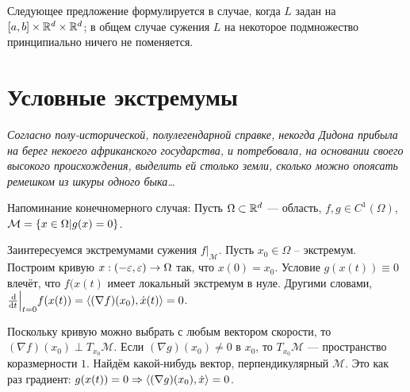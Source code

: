 \documentclass[a4paper]{article}
\begin{document}
    Следующее предложение формулируется в случае, когда $L$ задан на $[a, b] \times \mathbb{R}^d \times \mathbb{R}^d$; в общем случае сужения $L$ на некоторое подмножество принципиально ничего не поменяется.
    \section{Условные экстремумы}
    \emph{Согласно полу-исторической, полулегендарной справке, некогда Дидона прибыла на берег некоего африканского государства, и потребовала, на основании своего высокого происхождения, выделить ей столько земли, сколько можно опоясать ремешком из шкуры одного быка\ldots}

    Напоминание конечномерного случая:
    Пусть $\Omega \subset \mathbb{R}^d$ --- область, $f, g \in C^1(\Omega)$, $\mathcal{M} = \left\{x \in \Omega\middle|g(x) = 0\right\}$.

    Заинтересуемся экстремумами сужения $f\big|_{\mathcal{M}}$.
    Пусть $x_0 \in \Omega$ -- экстремум.
    Построим кривую ${x:(-\varepsilon,\varepsilon)\rightarrow \Omega}$ так, что $x(0) = x_0$.
    Условие $g(x(t)) \equiv 0$ влечёт, что $f(x(t)$ имеет локальный экстремум в нуле.
    Другими словами, $\frac{\operatorname{d}\!}{\operatorname{d}\! t}\Big|_{t = 0}f(x(t)) = \left\langle(\nabla f)(x_0), \dot{x}(t)\right\rangle = 0$.

    Поскольку кривую можно выбрать с любым вектором скорости, то $(\nabla f)(x_0) \perp T_{x_0}\mathcal{M}$.
    Если $(\nabla g)(x_0) \ne 0$ в $x_0$, то $T_{x_0}\mathcal{M}$ --- пространство коразмерности $1$.
    Найдём какой-нибудь вектор, перпендикулярный $\mathcal{M}$.
    Это как раз градиент: $g(x(t)) = 0 \Rightarrow \left\langle(\nabla g)(x_0), \dot{x}\right\rangle = 0$.
\end{document}
